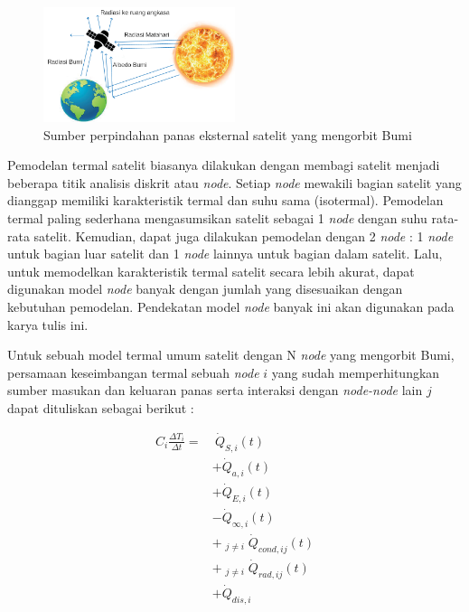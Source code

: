 \begin{figure}[H]
\setlength{}
\begin{center}
\includegraphics[width=0.5\textwidth]{fig/external_source.png}
	\caption[Sumber perpindahan panas eksternal satelit yang mengorbit Bumi]{Sumber perpindahan panas eksternal satelit yang mengorbit Bumi~\cite{abdelkhalek2019}}
\label{fig:externalsource}
\end{center}
\end{figure}

Pemodelan termal satelit biasanya dilakukan dengan membagi satelit menjadi
beberapa titik analisis diskrit atau \textit{node}. Setiap \textit{node}
mewakili bagian satelit yang dianggap memiliki karakteristik termal dan suhu
sama (isotermal). Pemodelan termal paling sederhana mengasumsikan satelit
sebagai 1 \textit{node} dengan suhu rata-rata satelit. Kemudian, dapat juga
dilakukan pemodelan dengan 2 \textit{node} : 1 \textit{node} untuk bagian luar
satelit dan 1 \textit{node} lainnya untuk bagian dalam satelit. Lalu, untuk
memodelkan karakteristik termal satelit secara lebih akurat, dapat digunakan
model \textit{node} banyak dengan jumlah yang disesuaikan dengan kebutuhan
pemodelan. Pendekatan model \textit{node} banyak ini akan digunakan pada karya
tulis ini.

Untuk sebuah model termal umum satelit dengan N \textit{node} yang mengorbit
Bumi, persamaan keseimbangan termal
sebuah \textit{node} $i$ yang sudah memperhitungkan sumber masukan dan keluaran
panas serta interaksi dengan \textit{node-node} lain $j$ dapat dituliskan
sebagai berikut \cite{martinez2022}:

\begin{equation}
\label{eq:qeq}
\begin{split}
	C_{i} \frac{\Delta T_i}{\Delta t} = &\ \dot{Q}_{S,i}(t)\\
	&+ \dot{Q}_{a,i}(t) \\
	&+ \dot{Q}_{E,i}(t) \\
	&- \dot{Q}_{\infty,i}(t) \\
	&+ \mathop{\sum_{j=1}^{N}}_{j \neq i} \dot{Q}_{cond,ij}(t) \\
	&+ \mathop{\sum_{j=1}^{N}}_{j \neq i} \dot{Q}_{rad,ij}(t) \\
	&+ \dot{Q}_{dis,i}
\end{split}
\end{equation}

